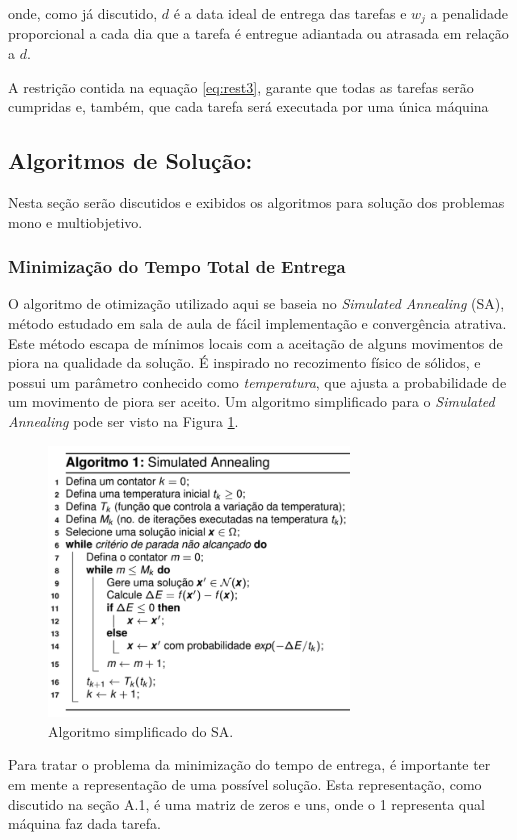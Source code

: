 \documentclass[conference]{IEEEtran}
\begin{document}
onde, como já discutido, $d$ é a data ideal de entrega das tarefas e $w_j$ a penalidade proporcional a cada dia que a tarefa é entregue adiantada ou atrasada em relação a $d$.

A restrição contida na equação \ref{eq:rest3}, garante que todas as tarefas serão cumpridas e, também, que cada tarefa será executada por uma única máquina

\subsection{Algoritmos de Solução:}
Nesta seção serão discutidos e exibidos os algoritmos para solução dos problemas mono e multiobjetivo.
\subsubsection{Minimização do Tempo Total de Entrega}
O algoritmo de otimização utilizado aqui se baseia no \textit{Simulated Annealing} (SA), método estudado em sala de aula de fácil implementação e convergência atrativa. Este método escapa de mínimos locais com a aceitação de alguns movimentos de piora na qualidade da solução. É inspirado no recozimento físico de sólidos, e possui um parâmetro conhecido como \textit{temperatura}, que ajusta a probabilidade de um movimento de piora ser aceito. Um algoritmo simplificado para o \textit{Simulated Annealing} pode ser visto na Figura \ref{fig:algoritmo}.

	\begin{figure}[h]
		\includegraphics[width=8cm]{img/sa.png}
		\caption{Algoritmo simplificado do SA.}
		\label{fig:algoritmo}
	\end{figure}
	
Para tratar o problema da minimização do tempo de entrega, é importante ter em mente a representação de uma possível solução. Esta representação, como discutido na seção A.1, é uma matriz de zeros e uns, onde o 1 representa qual máquina faz dada tarefa.
\end{document}
